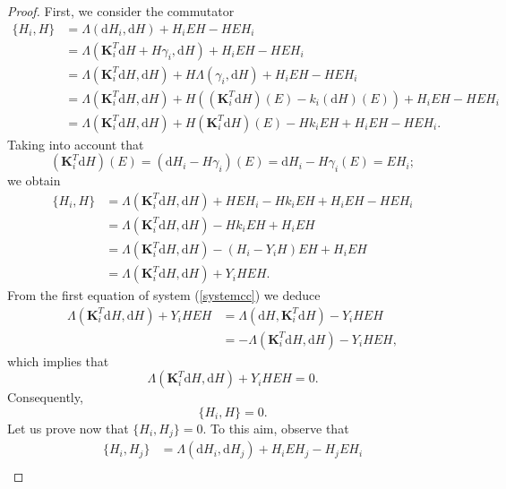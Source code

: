 \documentclass[10pt,a4paper]{amsart}
\newcommand{\bs}{\boldsymbol}
\newcommand{\rd}{\mathrm{d}}
\begin{document}
\begin{proof}
First, we consider the commutator 
\begin{equation}
\begin{split}
\lbrace H_{i},H\rbrace &=\Lambda(\rd H_{i},\rd H)+H_{i}EH-HEH_{i}\\
&=\Lambda(\bs{K}_{i}^{T}\rd H+H\gamma_{i},\rd H)+H_{i}EH-HEH_{i}\\
&=\Lambda(\bs{K}_{i}^{T}\rd H,\rd H)+H\Lambda(\gamma_{i},\rd H)+H_{i}EH-HEH_{i}\\
&=\Lambda(\bs{K}_{i}^{T}\rd H,\rd H)+H((\bs{K}_{i}^{T}\rd H)(E)-k_{i}(\rd H)(E))+H_{i}EH-HEH_{i}\\
&=\Lambda(\bs{K}_{i}^{T}\rd H,\rd H)+H(\bs{K}_{i}^{T}\rd H)(E)-Hk_{i}EH+H_{i}EH-HEH_{i}.
\end{split}
\end{equation}
Taking into account that
\begin{equation}
(\bs{K}_{i}^{T}\rd H)(E)=(\rd H_{i}-H\gamma_{i})(E)=\rd H_{i}-H\gamma_{i}(E)=EH_{i};
\end{equation}
we obtain
\begin{equation}
\begin{split}
\lbrace H_{i},H\rbrace &=\Lambda(\bs{K}_{i}^{T}\rd H,\rd H)+HEH_{i}-Hk_{i}EH+H_{i}EH-HEH_{i}\\
&=\Lambda(\bs{K}_{i}^{T}\rd H,\rd H)-Hk_{i}EH+H_{i}EH\\
&=\Lambda(\bs{K}_{i}^{T}\rd H,\rd H)-(H_{i}-Y_{i}H)EH+H_{i}EH\\
&=\Lambda(\bs{K}_{i}^{T}\rd H,\rd H)+Y_{i}HEH.
\end{split}
\end{equation}
From the first equation of system (\ref{systemcc}) we deduce
\begin{equation}
\begin{split}
\Lambda(\bs{K}_{i}^{T}\rd H,\rd H)+Y_{i}HEH&=\Lambda(\rd H,\bs{K}_{i}^{T}\rd H)-Y_{i}HEH\\
&=-\Lambda(\bs{K}_{i}^{T}\rd H,\rd H)-Y_{i}HEH,
\end{split}
\end{equation}
which implies that $$\Lambda(\bs{K}_{i}^{T}\rd H,\rd H)+Y_{i}HEH=0.$$  Consequently,
\begin{equation}
\lbrace H_{i},H\rbrace=0.
\end{equation}
Let us prove now that $\lbrace H_{i},H_{j}\rbrace=0$. To this aim, observe that
\begin{equation}
\begin{split}
\lbrace H_{i},H_{j}\rbrace &=\Lambda(\rd H_{i},\rd H_{j})+H_{i}EH_{j}-H_{j}EH_{i}\\

\end{split}
\end{equation}
\end{proof}
\end{document}

